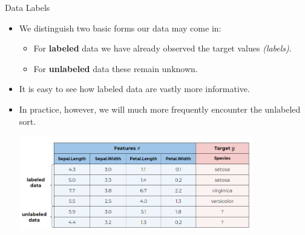 \documentclass[11pt,compress,t,notes=noshow, xcolor=table]{beamer}
\begin{document}
\begin{vbframe}{Data Labels}

\begin{itemize}

  \item We distinguish two basic forms our data may come in:
  
  \begin{itemize}
  
    \item For \textbf{labeled} data we have already observed the target values 
    \emph{(labels)}.
    
    \item For \textbf{unlabeled} data these remain unknown.
  
  \end{itemize}
  
  \item It is easy to see how labeled data are vastly more informative.
  
  \item In practice, however, we will much more frequently encounter the
  unlabeled sort.
  
  \begin{center}
    \includegraphics[width = 0.8\textwidth]{figure_man/ml-basic-data-example-iris-with-new.png} 
  \end{center}

\end{itemize}

\end{vbframe}

\end{document}
